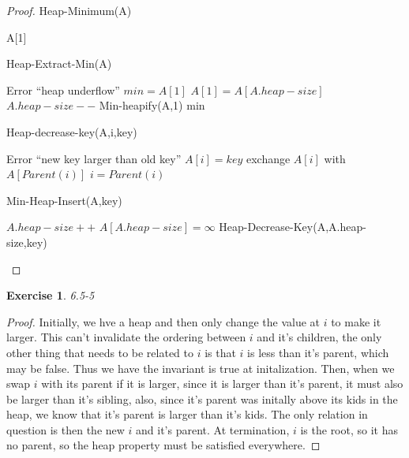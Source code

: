\documentclass{article}
\newtheorem{th1}{Exercise}
\begin{document}
\begin{proof}
Heap-Minimum(A)
\begin{algorithm}
\begin{algorithmic}[1]
\State \Return A[1]
\end{algorithmic}
\end{algorithm}

Heap-Extract-Min(A)
\begin{algorithm}
\begin{algorithmic}[1]
\State Error ``heap underflow''
\EndIf
\State $min = A[1]$
\State $A[1] = A[A.heap-size]$
\State $A.heap-size --$
\State Min-heapify(A,1)
\State \Return min 
\end{algorithmic}
\end{algorithm}

Heap-decrease-key(A,i,key)
\begin{algorithm}
\begin{algorithmic}[1]
\State Error ``new key larger than old key''
\EndIf
\State $A[i] =key$
\State exchange $A[i]$ with $A[Parent(i)]$
\State $i = Parent(i)$
\EndWhile
\end{algorithmic}
\end{algorithm}

Min-Heap-Insert(A,key)
\begin{algorithm}
\begin{algorithmic}[1]
\State $A.heap-size ++$
\State $A[A.heap-size] = \infty$
\State Heap-Decrease-Key(A,A.heap-size,key)
\end{algorithmic}
\end{algorithm}
\end{proof}
\begin{th1}\label{ex15}
6.5-5
\end{th1}
\begin{proof}
Initially, we hve a heap and then only change the value at $i$ to make it larger. This can't invalidate the ordering between $i$ and it's children, the only other thing that needs to be related to $i$ is that $i$ is less than it's parent, which may be false. Thus we have the invariant is true at initalization. Then, when we swap $i$ with its parent if it is larger, since it is larger than it's parent, it must also be larger than it's sibling, also, since it's parent was initally above its kids in the heap, we know that it's parent is larger than it's kids. The only relation in question is then the new $i$ and it's parent. At termination, $i$ is the root, so it has no parent, so the heap property must be satisfied everywhere.
\end{proof}
\end{document}

